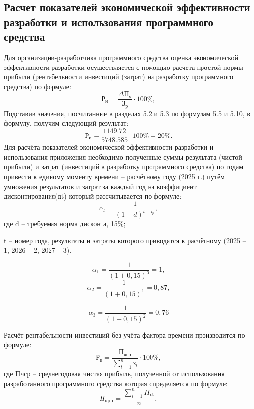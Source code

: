 \subsection{Расчет показателей экономической эффективности разработки и использования программного средства} 

Для организации-разработчика программного средства оценка экономической эффективности разработки осуществляется с помощью расчета простой нормы прибыли (рентабельности инвестиций (затрат) на разработку программного средства) по формуле:
\begin{equation}
	\mathrm{Р_{и}} = \frac{\Delta 	\mathrm{П_{ч}}}{\mathrm{З_{р}}} \cdot 100\%,
\end{equation}
Подставив значения, посчитанные в разделах 5.2 и 5.3 по формулам 5.5 и 5.10, в формулу, получим следующий результат:
\[
\mathrm{Р_{и}} = \frac{1149.72}{5748.585} \cdot 100\% = 20\%.
\]
Для расчёта показателей экономической эффективности разработки и использования приложения необходимо полученные суммы результата (чистой прибыли) и затрат (инвестиций в разработку программного средства) по годам привести к единому моменту времени – расчётному году (2025 г.) путём умножения результатов и затрат за каждый год на коэффициент дисконтирования(αt) который рассчитывается по формуле:
\begin{equation}
	\alpha_t = \frac{1}{(1 + d)^{t - t_p}},
\end{equation}
где d – требуемая норма дисконта, 15\%;

t – номер года, результаты и затраты которого приводятся к расчётному (2025 – 1, 2026 – 2, 2027 – 3).

\[
\alpha_1 = \frac{1}{(1+0{,}15)^0} = 1,
\]
\[
\alpha_2 = \frac{1}{(1+0{,}15)^1} = 0{,}87,
\]

\[
\alpha_3 = \frac{1}{(1+0{,}15)^2} = 0{,}76
\]

Расчёт рентабельности инвестиций без учёта фактора времени производится по формуле:
\begin{equation}
	\mathrm{Р_{и}} = \frac{\mathrm{П_{чср}}}{\sum_{t=1}^{n} \text{з}_t} \cdot 100\%,
\end{equation}
где Пчср – среднегодовая чистая прибыль, полученной от использования разработанного программного средства которая определяется по формуле:
\begin{equation}
	\Pi_{\mathrm{upp}} = \frac{\sum_{i=1}^{n} \Pi_{\mathrm{ut}}}{n},
\end{equation}
\newpage